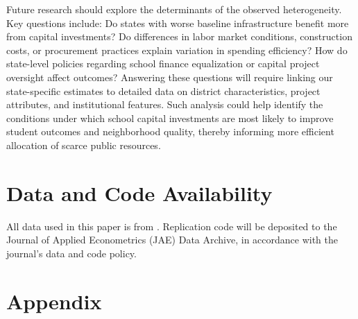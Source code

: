\documentclass[12pt]{article}
\begin{document}
Future research should explore the determinants of the observed heterogeneity. Key questions include: Do states with worse baseline infrastructure benefit more from capital investments? Do differences in labor market conditions, construction costs, or procurement practices explain variation in spending efficiency? How do state-level policies regarding school finance equalization or capital project oversight affect outcomes? Answering these questions will require linking our state-specific estimates to detailed data on district characteristics, project attributes, and institutional features. Such analysis could help identify the conditions under which school capital investments are most likely to improve student outcomes and neighborhood quality, thereby informing more efficient allocation of scarce public resources.

\section*{Data and Code Availability}

All data used in this paper is from \citet{biasi_what_2025}. Replication code will be deposited to the Journal of Applied Econometrics (JAE) Data Archive, in accordance with the journal’s data and code policy.




\singlespacing
\setlength\bibsep{0pt}

% 



\clearpage

\appendix
\section*{Appendix} \label{sec:appendix}




\clearpage


\end{document}
